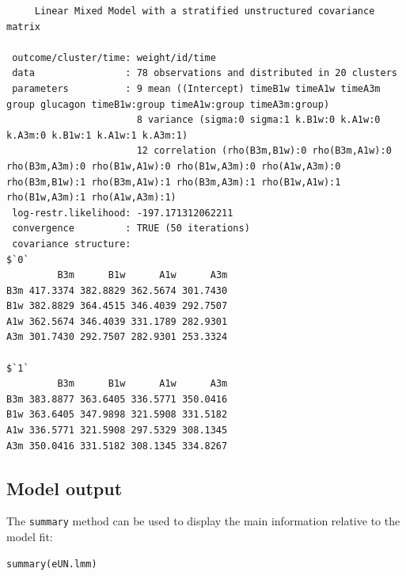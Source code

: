 \documentclass[12pt]{article}
\begin{document}
\begin{verbatim}
     Linear Mixed Model with a stratified unstructured covariance matrix 

 outcome/cluster/time: weight/id/time 
 data                : 78 observations and distributed in 20 clusters 
 parameters          : 9 mean ((Intercept) timeB1w timeA1w timeA3m group glucagon timeB1w:group timeA1w:group timeA3m:group) 
                       8 variance (sigma:0 sigma:1 k.B1w:0 k.A1w:0 k.A3m:0 k.B1w:1 k.A1w:1 k.A3m:1) 
                       12 correlation (rho(B3m,B1w):0 rho(B3m,A1w):0 rho(B3m,A3m):0 rho(B1w,A1w):0 rho(B1w,A3m):0 rho(A1w,A3m):0 rho(B3m,B1w):1 rho(B3m,A1w):1 rho(B3m,A3m):1 rho(B1w,A1w):1 rho(B1w,A3m):1 rho(A1w,A3m):1) 
 log-restr.likelihood: -197.171312062211 
 convergence         : TRUE (50 iterations)
 covariance structure: 
$`0`
         B3m      B1w      A1w      A3m
B3m 417.3374 382.8829 362.5674 301.7430
B1w 382.8829 364.4515 346.4039 292.7507
A1w 362.5674 346.4039 331.1789 282.9301
A3m 301.7430 292.7507 282.9301 253.3324

$`1`
         B3m      B1w      A1w      A3m
B3m 383.8877 363.6405 336.5771 350.0416
B1w 363.6405 347.9898 321.5908 331.5182
A1w 336.5771 321.5908 297.5329 308.1345
A3m 350.0416 331.5182 308.1345 334.8267
\end{verbatim}

\clearpage

\subsection{Model output}
\label{sec:org11730b6}

The \texttt{summary} method can be used to display the main information
relative to the model fit:
\lstset{language=r,label= ,caption= ,captionpos=b,numbers=none}
\begin{lstlisting}
summary(eUN.lmm)
\end{lstlisting}
\end{document}
